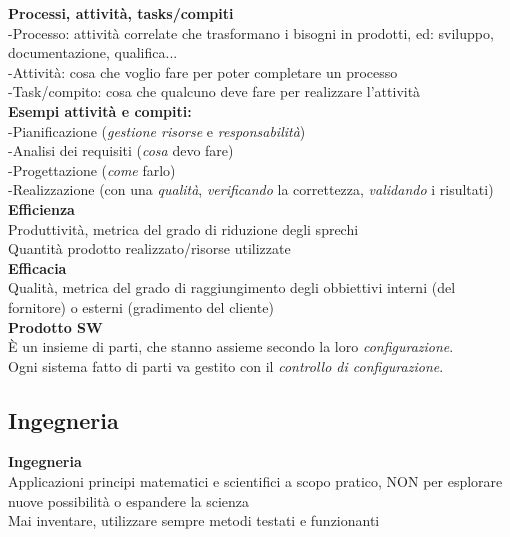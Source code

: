 \documentclass{article}
\begin{document}
		\textbf{Processi, attività, tasks/compiti}\\
		-Processo: attività correlate che trasformano i bisogni in prodotti, ed: sviluppo, documentazione, qualifica...\\
		-Attività: cosa che voglio fare per poter completare un processo\\
		-Task/compito: cosa che qualcuno deve fare per realizzare l'attività\\
			
		\textbf{Esempi attività e compiti:}\\
		-Pianificazione (\textit{gestione risorse} e \textit{responsabilità})\\
		-Analisi dei requisiti (\textsl{cosa} devo fare)\\
		-Progettazione (\textit{come} farlo)\\
		-Realizzazione (con una \textit{qualità}, \textit{verificando} la correttezza, \textit{validando} i risultati)\\
		
		\textbf{Efficienza}\\
		Produttività, metrica del grado di riduzione degli sprechi\\
		Quantità prodotto realizzato/risorse utilizzate\\
		
		\textbf{Efficacia}\\
		Qualità, metrica del grado di raggiungimento degli obbiettivi interni (del fornitore) o esterni (gradimento del cliente)\\
		
		\textbf{Prodotto SW}\\
		È un insieme di parti, che stanno assieme secondo la loro \textit{configurazione}.\\
		Ogni sistema fatto di parti va gestito con il \textit{controllo di configurazione}.
			
			
			
			
		
		
		
			
	\clearpage
	\subsection{Ingegneria}
		\textbf{Ingegneria}\\
			Applicazioni principi matematici e scientifici a scopo pratico, NON per esplorare nuove possibilità o espandere la scienza\\
			Mai inventare, utilizzare sempre metodi testati e funzionanti\\
			
\end{document}
